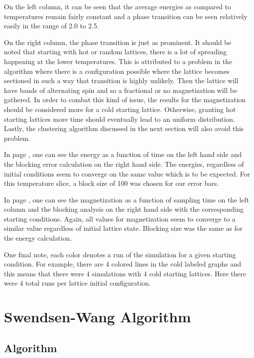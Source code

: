 \documentclass[a4]{scrartcl}
\begin{document}
On the left column, it can be seen that the average energies as compared to
temperatures remain fairly constant and a phase transition can be seen
relatively easily in the range of 2.0 to 2.5.

On the right column, the phase transition is just as prominent. It should be
noted that starting with hot or random lattices, there is a lot of spreading
happening at the lower temperatures. This is attributed to a problem in the
algorithm where there is a configuration possible where the lattice becomes
sectioned in such a way that transition is highly unlikely. Then the lattice
will have bands of alternating spin and so a fractional or no magnetization
will be gathered. In order to combat this kind of issue, the results for the
magnetization should be considered more for a cold starting lattice. Otherwise,
granting hot starting lattices more time should eventually lead to an uniform
distribution. Lastly, the clustering algorithm discussed in the next section
will also avoid this problem.

In page \pageref{MCE}, one can see the energy as a function of time on the left
hand side and the blocking error calculation on the right hand side. The
energies, regardless of initial conditions seem to converge on the same value
which is to be expected. For this temperature slice, a block size of 100 was
chosen for our error bars.

In page \pageref{MCM}, one can see the magnetization as a function of sampling
time on the left column and the blocking analysis on the right hand side with
the corresponding starting conditions. Again, all values for magnetization seem
to converge to a similar value regardless of initial lattice state. Blocking
size was the same as for the energy calculation.

One final note, each color denotes a run of the simulation for a given starting
condition. For example, there are 4 colored lines in the cold labeled graphs
and this means that there were 4 simulations with 4 cold starting lattices.
Here there were 4 total runs per lattice initial configuration.


\section{Swendsen-Wang Algorithm}
\subsection{Algorithm}
\end{document}
